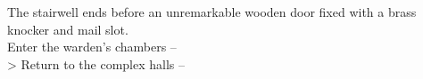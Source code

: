 The stairwell ends before an unremarkable wooden door fixed with a brass knocker and mail slot.\\

 Enter the warden's chambers -- \\
> Return to the complex halls -- 